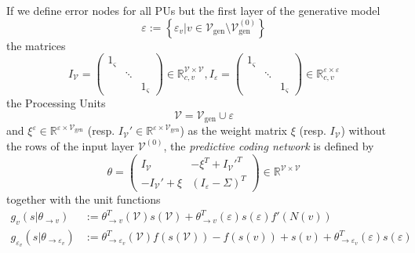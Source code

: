 \documentclass[a4paper,11pt]{article}
\newcommand{\const}{\varsigma}
\begin{document}
\begin{Def}\label{pcm2-def}
If we define error nodes for all PUs but the first layer of the generative model
\begin{equation}
\varepsilon:=\left\{\varepsilon_v|v\in\mathcal{V}_{\text{gen}}\setminus\mathcal{V}^{(0)}_{\text{gen}}\right\}
\end{equation}
the matrices
\begin{equation}
I_{\mathcal{V}}=\begin{pmatrix}
1_{\const}&&\\&\ddots&\\&&1_{\const}
\end{pmatrix}\in\mathbb{R}_{c,v}^{\mathcal{V}\times\mathcal{V}}, 
I_{\varepsilon}=\begin{pmatrix}
1_{\const}&&\\&\ddots&\\&&1_{\const}
\end{pmatrix}\in\mathbb{R}_{c,v}^{\varepsilon\times\varepsilon}
\end{equation}
the Processing Units
\begin{equation}
\mathcal{V}=\mathcal{V}_{\text{gen}}\cup\varepsilon
\end{equation}
and $\xi^{\varepsilon}\in\mathbb{R}^{\varepsilon\times\mathcal{V}_{\text{gen}}}$ (resp. $I_{\mathcal{V}}'\in\mathbb{R}^{\varepsilon\times\mathcal{V}_{\text{gen}}}$) as the weight matrix $\xi$ (resp. $I_{\mathcal{V}}$) without the rows of the input layer $\mathcal{V}^{(0)}$, the \emph{predictive coding network} is defined by
\begin{equation}
\theta=\begin{pmatrix}
I_{\mathcal{V}}&-\xi^T+I_{\mathcal{V}}'^T\\
-I_{\mathcal{V}}'+\xi&(I_{\varepsilon}-\Sigma)^T
\end{pmatrix}\in\mathbb{R}^{\mathcal{V}\times\mathcal{V}}
\end{equation}
together with the unit functions
\begin{align}
\label{pcm2-v}g_v(s|\theta_{\to v})&:=\theta_{\to v}^T(\mathcal{V})s(\mathcal{V}) + \theta_{\to v}^T(\varepsilon)s(\varepsilon)f'(N(v))\\
\label{pcm2-eps}g_{\varepsilon_v}(s|\theta_{\to\varepsilon_v})&:=\theta_{\to\varepsilon_v}^T(\mathcal{V})f(s(\mathcal{V}))-f(s(v))+s(v)+\theta_{\to\varepsilon_v}^T(\varepsilon)s(\varepsilon)
\end{align}
\end{Def}
\end{document}
